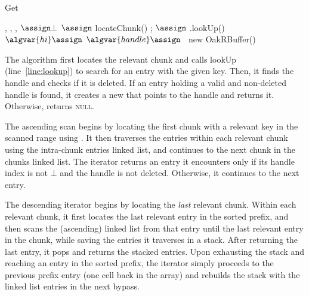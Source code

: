\begin{algorithm}[tb]
\small
\caption{Get}
\label{alg:get}
\begin{algorithmic}[1]
\State {}, , ,  $\assign \bot$
\State {} $\assign$ locateChunk(\key)  \label{line:locate chunk}; 
{} $\assign$ .lookUp(\key) \label{line:lookup}
  $\algvar{hi} \assign$ 
\EndIf \label{line:get ei}
 $\algvar{handle} \assign $
\EndIf \label{line:get hi}
 \Return \NULL \label{line:get check deleted}
\Else \ \Return new OakRBuffer()
\EndIf
\EndProcedure
{}
\end{algorithmic}
\end{algorithm}

The algorithm first locates the relevant chunk and calls lookUp (line~\ref{line:lookup}) to search for an entry with the given key.
Then, it finds the handle and checks if it is deleted. %
If an entry holding a valid and non-deleted handle is found, it creates a new  that points to the handle and returns it. Otherwise,  returns \textsc{null}.

The ascending scan begins by locating the first chunk with a relevant key in the scanned range using . 
It then traverses the entries within each relevant chunk using the intra-chunk entries linked list, and continues to the next chunk in the chunks linked list. 
The iterator returns an entry it encounters only if its handle index is not $\bot$ and the handle is not deleted. Otherwise, it continues to the next entry.

The descending iterator begins by locating the \emph{last} relevant chunk.
Within each relevant chunk, it first locates the last relevant entry in the sorted prefix, and then 
scans the (ascending) linked list from that entry until the last relevant entry in the chunk, while saving the entries it traverses in a stack.
After returning the last entry, it pops and returns the stacked entries.  
Upon exhausting the stack and reaching an entry in the sorted prefix, the iterator simply proceeds to the previous prefix entry (one cell back in the array) and rebuilds the stack with the linked list entries in the next bypass. 


